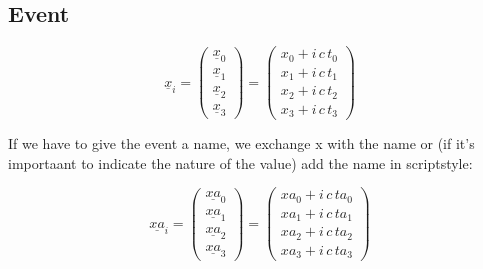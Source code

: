 \documentclass[]{article}
\title{}
\author{}
\begin{document}

\subsection{Event}
\begin{equation}
\underline{x}_i
=
\begin{pmatrix}
	\underline{x}_0\\
	\underline{x}_1\\
	\underline{x}_2\\
	\underline{x}_3
\end{pmatrix}
=
\begin{pmatrix}
	x_0 + i\, c\, t_0\\
	x_1 + i\, c\, t_1\\
	x_2 + i\, c\, t_2\\
	x_3 + i\, c\, t_3
\end{pmatrix}
\end{equation}

If we have to give the event a name, we exchange x with the name or (if it's importaant to indicate the nature of the value) add the name in scriptstyle:

\begin{equation}
\underline{x{\scriptstyle a}}_i
=
\begin{pmatrix}
	\underline{x{\scriptstyle a}}_0\\
	\underline{x{\scriptstyle a}}_1\\
	\underline{x{\scriptstyle a}}_2\\
	\underline{x{\scriptstyle a}}_3
\end{pmatrix}
=
\begin{pmatrix}
	x{\scriptstyle a}_0 + i\, c\, t{\scriptstyle a}_0\\
	x{\scriptstyle a}_1 + i\, c\, t{\scriptstyle a}_1\\
	x{\scriptstyle a}_2 + i\, c\, t{\scriptstyle a}_2\\
	x{\scriptstyle a}_3 + i\, c\, t{\scriptstyle a}_3
\end{pmatrix}
\end{equation}
\end{document}
